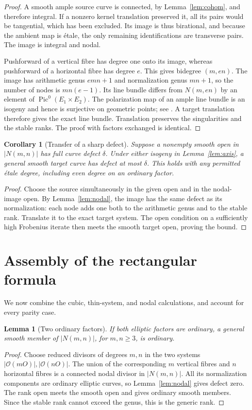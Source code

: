 \documentclass[11pt]{article}
\newtheorem{lemma}[theorem]{Lemma}
\newtheorem{corollary}[theorem]{Corollary}
\theoremstyle{definition}\newtheorem{definition}[theorem]{Definition}
\theoremstyle{remark}\newtheorem{remark}[theorem]{Remark}
\newcommand{\OO}{\mathcal O}
\newcommand{\Pic}{\operatorname{Pic}}
\begin{document}
\begin{proof}
A smooth ample source curve is connected, by Lemma~\ref{lem:cohom}, and therefore integral. If a nonzero kernel translation preserved it, all its pairs would be tangential, which has been excluded. Its image is thus birational, and because the ambient map is \'etale, the only remaining identifications are transverse pairs. The image is integral and nodal.

Pushforward of a vertical fibre has degree one onto its image, whereas pushforward of a horizontal fibre has degree $e$. This gives bidegree $(m,en)$. The image has arithmetic genus $emn+1$ and normalization genus $mn+1$, so the number of nodes is $mn(e-1)$. Its line bundle differs from $N(m,en)$ by an element of $\Pic^0(E_1\times E_2)$. The polarization map of an ample line bundle is an isogeny and hence is surjective on geometric points; see \citet[Proposition~6.13, pp.~93--94]{EGM}. A target translation therefore gives the exact line bundle. Translation preserves the singularities and the stable ranks. The proof with factors exchanged is identical.
\end{proof}

\begin{corollary}[Transfer of a sharp defect]\label{cor:transfer}
Suppose a nonempty smooth open in $|N(m,n)|$ has full curve defect $\delta$. Under either isogeny in Lemma~\ref{lem:axis}, a general smooth target curve has defect at most $\delta$. This holds with any permitted \'etale degree, including even degree on an ordinary factor.
\end{corollary}
\begin{proof}
Choose the source simultaneously in the given open and in the nodal-image open. By Lemma~\ref{lem:nodal}, the image has the same defect as its normalization: each node adds one both to the arithmetic genus and to the stable rank. Translate it to the exact target system. The open condition on a sufficiently high Frobenius iterate then meets the smooth target open, proving the bound.
\end{proof}

\section{Assembly of the rectangular formula}\label{sec:assembly}

We now combine the cubic, thin-system, and nodal calculations, and account for every parity case.

\begin{lemma}[Two ordinary factors]\label{lem:ordinary-grid}
If both elliptic factors are ordinary, a general smooth member of $|N(m,n)|$, for $m,n\ge3$, is ordinary.
\end{lemma}
\begin{proof}
Choose reduced divisors of degrees $m,n$ in the two systems $|\OO(mO)|,|\OO(nO)|$. The union of the corresponding $m$ vertical fibres and $n$ horizontal fibres is a connected nodal divisor in $|N(m,n)|$. All its normalization components are ordinary elliptic curves, so Lemma~\ref{lem:nodal} gives defect zero. The rank open meets the smooth open and gives ordinary smooth members. Since the stable rank cannot exceed the genus, this is the generic rank.
\end{proof}
\end{document}
